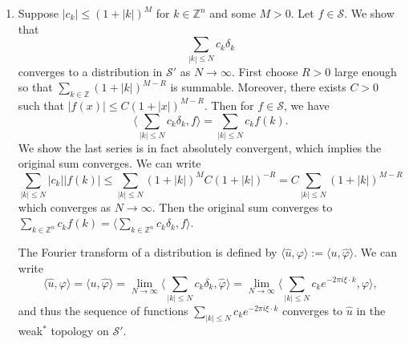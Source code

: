 \documentclass[11pt, reqno]{article}
\theoremstyle{plain}
\theoremstyle{definition}
\theoremstyle{remark}
\renewcommand{\phi}{\varphi}
\newcommand{\ZZ}{\mathbb{Z}}
\begin{document}
\begin{enumerate}
    \item[2.3.8.] Suppose $|c_k| \leq (1 + |k|)^{M}$ for $k \in \ZZ^n$ and some $M > 0$. Let $f \in \mathscr{S}$. We
    show that 
    \[
        \sum_{|k| \leq N}c_k \delta_k
    \]
    converges to a distribution in $\mathscr{S}'$ as $N \to \infty$. First choose $R > 0$ large enough so that 
    $\sum_{k \in \ZZ} (1 + |k|)^{M-R}$ is summable. Moreover, there exists $C > 0$ such that $|f(x)| \leq C(1 + |x|)^{M-R}$. 
    Then for $f \in \mathscr{S}$, we have
    \[
        \langle \sum_{|k| \leq N}c_k \delta_k, f\rangle = \sum_{|k| \leq N}c_k f(k).
    \]
    We show the last series is in fact absolutely convergent, which implies the original sum converges.
    We can write
    \[
        \sum_{|k| \leq N} |c_k||f(k)| \leq \sum_{|k| \leq N}(1 + |k|)^{M}C(1 + |k|)^{-R} = C \sum_{|k| \leq N}(1 + |k|)^{M-R}
    \]
    which converges as $N \to \infty$. Then the original sum converges to $\sum_{k \in \ZZ^n}c_k f(k) = \langle\sum_{k \in \ZZ^n}c_k \delta_k, f\rangle$.

    The Fourier transform of a distribution is defined by $\langle \widehat{u}, \phi\rangle := \langle u, \widehat{\phi}\rangle$.
    We can write
    \[
        \langle \widehat{u}, \phi\rangle = \langle u, \widehat{\phi}\rangle = \lim_{N \to \infty} \langle \sum_{|k| \leq N} c_k \delta_k, \widehat{\phi}\rangle
        = \lim_{N \to \infty}\langle \sum_{|k| \leq N} c_k e^{-2\pi i \xi\cdot k}, \phi\rangle,
    \]
    and thus the sequence of functions $\sum_{|k| \leq N}c_k e^{-2\pi i \xi\cdot k}$ converges to $\widehat{u}$ 
    in the weak$^*$ topology on $\mathscr{S}'$.

\end{enumerate}
\end{document}
